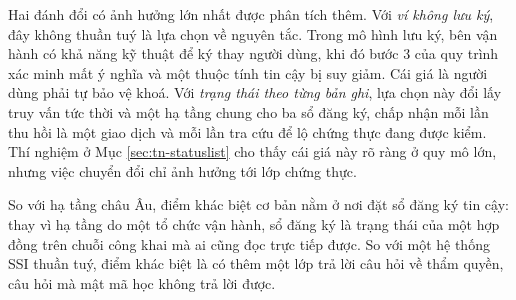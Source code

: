 

Hai đánh đổi có ảnh hưởng lớn nhất được phân tích thêm. Với \textit{ví không lưu ký}, đây không thuần tuý là lựa chọn về nguyên tắc. Trong mô hình lưu ký, bên vận hành có khả năng kỹ thuật để ký thay người dùng, khi đó bước 3 của quy trình xác minh mất ý nghĩa và một thuộc tính tin cậy bị suy giảm. Cái giá là người dùng phải tự bảo vệ khoá. Với \textit{trạng thái theo từng bản ghi}, lựa chọn này đổi lấy truy vấn tức thời và một hạ tầng chung cho ba sổ đăng ký, chấp nhận mỗi lần thu hồi là một giao dịch và mỗi lần tra cứu để lộ chứng thực đang được kiểm. Thí nghiệm ở Mục \ref{sec:tn-statuslist} cho thấy cái giá này rõ ràng ở quy mô lớn, nhưng việc chuyển đổi chỉ ảnh hưởng tới lớp chứng thực.

So với hạ tầng châu Âu, điểm khác biệt cơ bản nằm ở nơi đặt sổ đăng ký tin cậy: thay vì hạ tầng do một tổ chức vận hành, sổ đăng ký là trạng thái của một hợp đồng trên chuỗi công khai mà ai cũng đọc trực tiếp được. So với một hệ thống SSI thuần tuý, điểm khác biệt là có thêm một lớp trả lời câu hỏi về thẩm quyền, câu hỏi mà mật mã học không trả lời được.
